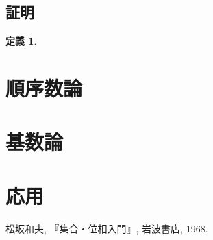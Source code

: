 \documentclass[a4paper]{bxjsarticle}
\theoremstyle{definition}
\newtheorem{defn}[thm]{定義}
\newtheorem{rem}[thm]{注意}
\begin{document}
    \subsection{証明}
    \begin{defn}
        
    \end{defn}
    
    
    
    
    \section{順序数論}
    \section{基数論}
    \section{応用}
    \begin{thebibliography}{9}
     松坂和夫, 『集合・位相入門』, 岩波書店, 1968.
    
    \end{thebibliography}
\end{document}
